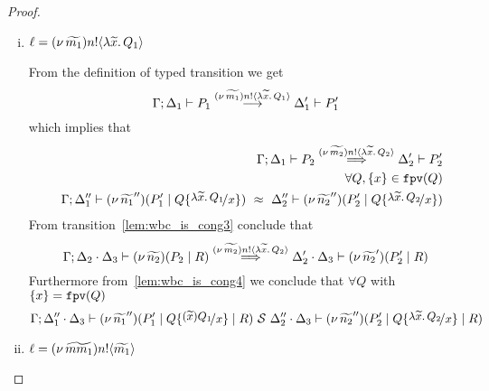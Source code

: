 \begin{proof}
\begin{enumerate}
\begin{enumerate}[i.]
					\item	$\ell = (\nu\, \widetilde{m_1}) n ! \langle \lambda \widetilde{x}.\,Q_1 \rangle$

							\noi From the definition of typed transition we get
							\[
								\Gamma; \Delta_1 \vdash P_1 \stackrel{(\nu\, \widetilde{m_1}) n ! \langle \lambda \widetilde{x}.\,Q_1 \rangle}{\longrightarrow} \Delta_1' \vdash P_1'
							\]
							\noi which implies that
							\begin{eqnarray}
								&& \horel{\Gamma}{\Delta_1}{P_2}{\By{\news{\widetilde{m_2}} \bactout{n}{\abs{\widetilde{x}}{Q_2}}}}{\Delta_2'}{P_2'}
								\label{lem:wbc_is_cong3} \\
								&&\forall Q, \set{x} \in \fpv{Q} \nonumber \\
								&& \horel{\Gamma}{\Delta_1''}{\newsp{\widetilde{n_1}''}{P_1' \Par Q \subst{\abs{\widetilde{x}}{Q_1}}{x}}}
								{\ \wbc\ }
								{\Delta_2''}{\newsp{\widetilde{n_2}''}{P_2' \Par Q \subst{\abs{\widetilde{x}}{Q_2}}{x}}}
								\label{lem:wbc_is_cong4}
							\end{eqnarray}
							\noi From transition~\eqref{lem:wbc_is_cong3} conclude that 
							\[
								\Gamma; \Delta_2 \cdot \Delta_3 \vdash (\nu\, \widetilde{n_2})(P_2 \;|\; R) \stackrel{(\nu\, \widetilde{m_2}) n ! \langle \lambda \widetilde{x}.\,Q_2 \rangle}{\Longrightarrow} \Delta_2' \cdot \Delta_3 \vdash (\nu\, \widetilde{n_2}')(P_2' \;|\; R)
							\]
							\noi Furthermore from~\eqref{lem:wbc_is_cong4} we conclude that $\forall Q$ with $\{x\} = \mathtt{fpv}(Q)$
							\[
								\horel{\Gamma}{\Delta_1'' \cat \Delta_3}{\newsp{\widetilde{n_1}''}{P_1' \Par Q \subst{(\widetilde{x}) Q_1}{x} \Par R}}
								{\ \mathcal{S}\ }
								{\Delta_2'' \cat \Delta_3}{\newsp{\widetilde{n_2}''}{P_2' \Par Q \subst{\abs{\widetilde{x}}{Q_2}}{x} \Par R}}
							\]

					\item	$\ell = (\nu\, \widetilde{mm_1}) n ! \langle \widetilde{m_1} \rangle$


\end{enumerate}
\end{enumerate}
\end{proof}
